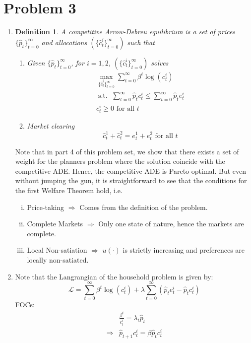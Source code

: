 \documentclass[12pt]{article}
\newtheorem{definition}[theorem]{Definition}
\newcommand{\1}{{\bf 1}} %
\newcommand{\La}{\mathscr{L}}
\DeclareMathOperator{\subjectto}{{s.t.\ }} %
\newcommand\seq[1]{\{ #1 \}}
\begin{document}
\section*{Problem 3}
\begin{enumerate}[(1)]
	\item
	
	\begin{definition}
		A competitive Arrow-Debreu equilibrium is a set of prices $\seq{\hat{p}_t}_{t=0}^{\infty}$ and allocations $(\seq{\hat{c}^i_t}_{t=0}^{\infty})$ such that
		\begin{enumerate}
			\item Given $\seq{\hat{p}_t}_{t=0}^{\infty}$, for $i = 1, 2$, $(\seq{\hat{c}^i_t}_{t=0}^{\infty})$ solves
			\[
			\begin{split}
			\max_{\seq{\hat{c}^i_t}_{t=0}^{\infty}} \sum_{t=0}^{\infty}\beta^t \log(c_t^i)\\
			\subjectto \sum_{t=0}^{\infty}\hat{p}_tc_t^i\leq \sum_{t=0}^{\infty}\hat{p}_te_t^i\\
			c_{t}^i\geq 0 \text{ for all }t
			\end{split}
			\]
			\item Market clearing
			\[\hat{c}_t^1+\hat{c}_t^2=e_t^1+e_t^2 \text{ for all }t \]
		\end{enumerate}
	\end{definition}


	Note that in part 4 of this problem set, we show that there exists a set of weight for the planners problem where the solution coincide with the competitive ADE. Hence, the competitive ADE is Pareto optimal. But even without jumping the gun, it is straightforward to see that the conditions for the first Welfare Theorem hold, i.e.
	\begin{enumerate}[(i)]
		\item Price-taking $\Rightarrow$ Comes from the definition of the problem. 
		\item Complete Markets $\Rightarrow$ Only one state of nature, hence the markets are complete. 
		\item Local Non-satiation $\Rightarrow$ $u(\cdot)$ is strictly increasing and preferences are locally non-satiated.
	\end{enumerate}
	
	
	
	\item
	
	Note that the Langrangian of the household problem is given by:
	\[
	\La = \sum_{t=0}^{\infty} \beta^t \log(c^i_t) + \lambda \sum_{t=0}^{\infty}(\hat{p}_te^i_t-\hat{p}_tc_t^i)
	\] 
	FOCs:
	\[
\begin{split}
	& \frac{\beta^t }{c^i_t} = \lambda_t \hat{p}_t\\
	\Rightarrow & \hat{p}_{t+1}c_t^i = \beta\hat{p}_tc_t^i
	\end{split}
	\]
	

\end{enumerate}
\end{document}
